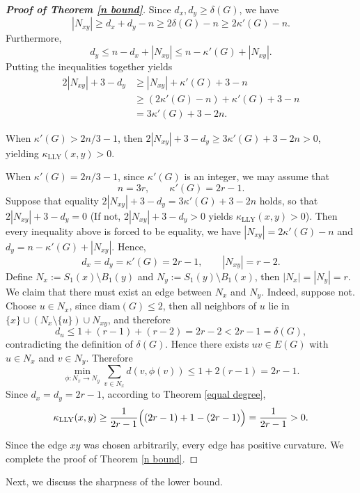 \documentclass[11pt,bezier]{article}
\theoremstyle{definition}
\theoremstyle{definition}
\theoremstyle{nonumber}
\newtheorem*{theorem*}{Theorem}
\begin{document}
\begin{proof}[\bf{Proof of Theorem \ref{n bound}}]
Since $d_x,d_y\ge \delta(G)$, we have 
$$
|N_{xy}|\geq d_x+d_y-n\geq 2\delta(G)-n\ge 2\kappa'(G)-n.
$$
Furthermore, 
$$
d_y\leq n-d_x+|N_{xy}|\le n-\kappa'(G)+|N_{xy}|.
$$
Putting the inequalities together yields
\begin{align*}
2|N_{xy}|+3-d_y&\geq |N_{xy}|+\kappa'(G)+3-n\\
&\geq(2\kappa'(G)-n)+\kappa'(G)+3-n\\
&=3\kappa'(G)+3-2n.
\end{align*}

When $\kappa'(G)>2n/3-1$, then $2|N_{xy}|+3-d_y\geq3\kappa'(G)+3-2n>0$, yielding $\kappa_{\mathrm{LLY}}(x,y)>0$.

When $\kappa'(G)=2n/3-1$, since $\kappa'(G)$ is an integer, we may assume that 
$$
n=3r,\qquad\kappa'(G)=2r-1.
$$
Suppose that equality $2|N_{xy}|+3-d_y=3\kappa'(G)+3-2n$ holds, so that $2|N_{xy}|+3-d_y=0$ (If not, $2|N_{xy}|+3-d_y>0$ yields $\kappa_{\mathrm{LLY}}(x,y)>0$).
Then every inequality above is forced to be equality, we have $|N_{xy}|=2\kappa'(G)-n$ and $d_y=n-\kappa'(G)+|N_{xy}|.$ Hence, 
$$
d_x=d_y=\kappa'(G)=2r-1,\qquad|N_{xy}|=r-2.
$$
Define $N_x:=S_1(x)\setminus B_1(y)$ and $N_y:=S_1(y)\setminus B_1(x)$,
then $|N_x|=|N_y|=r$.
We claim that there must exist an edge between $N_x$ and $N_y$.
Indeed, suppose not. Choose $u\in N_x$, since $\mathrm{diam}(G) \leq 2$, then all neighbors of $u$ lie in $\{x\}\cup(N_x\setminus\{u\})\cup N_{xy}$, and therefore
$$
d_u\leq1+(r-1)+(r-2)=2r-2<2r-1=\delta(G),
$$
contradicting the definition of $\delta(G)$.
Hence there exists $uv\in E(G)$ with $u\in N_x$ and $v\in N_y$.
Therefore
$$\min_{\phi: N_x \to N_y} \sum_{v \in N_x} d(v, \phi(v))\leq1+2(r-1)=2r-1.$$
Since $d_x=d_y=2r-1$, according to Theorem \ref{equal degree}, 
$$\kappa_{\mathrm{LLY}}(x,y)\ge\frac1{2r-1}\Bigl((2r-1)+1-(2r-1)\Bigr)=\frac1{2r-1}>0.$$

Since the edge $xy$ was chosen arbitrarily, every edge has positive curvature. We complete the proof of Theorem \ref{n bound}.
\end{proof}

Next, we discuss the sharpness of the lower bound.

\end{document}
